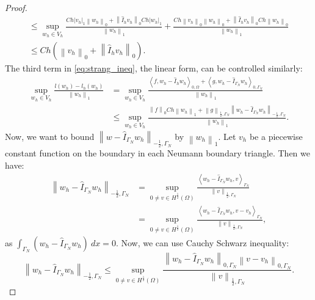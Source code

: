 \documentclass[../Main/main.tex]{subfiles}
\begin{document}
\begin{proof}
\begin{equation}
\begin{gathered}
				\leq 				 \sup_{w_h\in V_h}\frac{Ch| v_h|_1\left \| w_h \right \|_0  + \left \|\hat{I}_h v_h\right \|_0 Ch|w_h|_1}{\left \| w_h \right \|_1} + \frac{Ch\left \| v_h \right \|_0 \left \| w_h \right \|_0 + \left \|\hat{I}_h v_h\right \|_0 Ch\left \| w_h \right \|_0}{\left \| w_h \right \|_1}\\
				\leq Ch \left (\left \| v_h \right \|_0 + \left \| \hat{I}_h v_h \right \|_0 \right ).
			\end{gathered}
		\end{equation}
		The third term in \eqref{eq:strang_ineq}, the linear form, can be controlled similarly:
		\begin{equation}\label{eq:334}
			\begin{aligned}
				\sup_{w_h \in V_h} \frac{l(w_h)-l_h(w_h)}{\left \| w_h \right \|_1} &= \sup_{w_h \in V_h} \frac{\left \langle f,w_h-\hat{I}_h w_h \right \rangle_{0,\Omega} + \left \langle g,w_h-\hat{I}_{\Gamma_N} w_h \right \rangle_{0,\Gamma_N}}{\left \| w_h \right \|_1}\\
				&\leq \sup_{w_h \in V_h} \frac{\left \|f\right \|_0 Ch\left \|w_h \right \|_1 + \left \|g\right \|_{\frac{1}{2},\Gamma_N}\left \|w_h-\hat{I}_{\Gamma_N} w_h\right \|_{-\frac{1}{2},\Gamma_N}}{\left \| w_h \right \|_1}.
			\end{aligned}
		\end{equation}
		Now, we want to bound $\left \|w-\hat{I}_{\Gamma_N} w_h\right \|_{-\frac{1}{2},\Gamma_N}$ by $\left \| w_h \right \|_1$. Let $v_h$ be a piecewise constant function on the boundary in each Neumann boundary triangle. Then we have:
		\begin{equation}
			\begin{aligned}
				\left \|w_h-\hat{I}_{\Gamma_N} w_h\right \|_{-\frac{1}{2},\Gamma_N} &= \sup_{0 \neq v \in H^{\frac{1}{2}}(\Omega)}\frac{\left \langle w_h-\hat{I}_{\Gamma_N} w_h,v\right \rangle_{\Gamma_N}}{\left \| v \right \|_{\frac{1}{2},\Gamma_N}}\\
				&=\sup_{0 \neq v \in H^{\frac{1}{2}}(\Omega)}\frac{\left \langle w_h-\hat{I}_{\Gamma_N} w_h,v-v_h\right \rangle_{\Gamma_N}}{\left \| v\right \|_{\frac{1}{2},\Gamma_N}},
			\end{aligned}
		\end{equation}
		as $\int_{\Gamma_N} (w_h-\hat{I}_{\Gamma_N} w_h) \ dx = 0$. Now, we can use Cauchy Schwarz inequality:
		\begin{equation}\label{eq:neumann CS estimate}
			\left \|w_h-\hat{I}_{\Gamma_N} w_h\right \|_{-\frac{1}{2},\Gamma_N} \leq \sup_{0 \neq v \in H^{\frac{1}{2}}(\Omega)}\frac{\left \| w_h-\hat{I}_{\Gamma_N} w_h\right \|_{0,\Gamma_N}\left \| v-v_h\right \|_{0,\Gamma_N}}{\left \| v\right \|_{\frac{1}{2},\Gamma_N}}.

\end{equation}
\end{proof}
\end{document}
